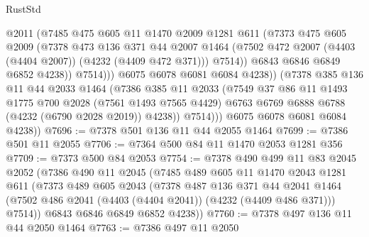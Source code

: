 \begin{lexlean}{RustStd}
\begin{coremodule}
                        @2011
                        (@7485
                          @475
                          @605
                          @11
                          @1470
                          @2009
                          @1281
                          @611
                          (@7373
                            @475
                            @605
                            @2009
                            (@7378
                              @473
                              @136
                              @371
                              @44
                              @2007
                              @1464
                              (@7502 @472 @2007 (@4403 (@4404 @2007)) (@4232 (@4409 @472 @371)))
                              @7514))
                          @6843
                          @6846
                          @6849
                          @6852
                          @4238))
                      @7514)))
                @6075
                @6078
                @6081
                @6084
                @4238))
            (@7378
              @385
              @136
              @11
              @44
              @2033
              @1464
              (@7386
                @385
                @11
                @2033
                (@7549
                  @37
                  @86
                  @11
                  @1493
                  @1775
                  @700
                  @2028
                  (@7561 @1493 @7565 @4429)
                  @6763
                  @6769
                  @6888
                  @6788
                  (@4232 (@6790 @2028 @2019))
                  @4238))
              @7514)))
        @6075
        @6078
        @6081
        @6084
        @4238))
@7696 := @7378 @501 @136 @11 @44 @2055 @1464
@7699 := @7386 @501 @11 @2055
@7706 := @7364 @500 @84 @11 @1470 @2053 @1281 @356
@7709 := @7373 @500 @84 @2053
@7754 := @7378
    @490
    @499
    @11
    @83
    @2045
    @2052
    (@7386
      @490
      @11
      @2045
      (@7485
        @489
        @605
        @11
        @1470
        @2043
        @1281
        @611
        (@7373
          @489
          @605
          @2043
          (@7378
            @487
            @136
            @371
            @44
            @2041
            @1464
            (@7502 @486 @2041 (@4403 (@4404 @2041)) (@4232 (@4409 @486 @371)))
            @7514))
        @6843
        @6846
        @6849
        @6852
        @4238))
@7760 := @7378 @497 @136 @11 @44 @2050 @1464
@7763 := @7386 @497 @11 @2050

\end{coremodule}
\end{lexlean}
